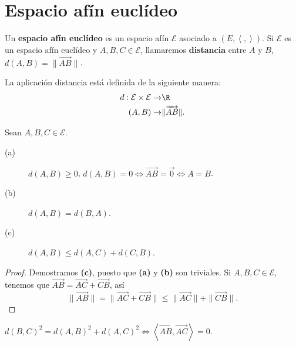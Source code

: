 \chapter{Espacio afín euclídeo}
\begin{fdefinition}
\normalfont Un \textbf{espacio afín euclídeo} es un espacio afín $\displaystyle \mathcal{E} $ asociado a $\displaystyle \left(E, \left\langle ,  \right\rangle \right) $. Si $\displaystyle \mathcal{E} $ es un espacio afín euclídeo y $\displaystyle A, B, C \in \mathcal{E} $, llamaremos \textbf{distancia} entre $\displaystyle A $ y $\displaystyle B $, $\displaystyle d\left(A,B\right) = \|\overrightarrow{AB}\| $.  
\end{fdefinition}
\begin{observation}
\normalfont La aplicación distancia está definida de la siguiente manera:
\[
\begin{split}
	d : \mathcal{E} \times \mathcal{E} \to & \R \\
	\left(A,B\right) \to & \|\overrightarrow{AB}\|.
\end{split}
\]
\end{observation}
\begin{fprop}[]
\normalfont Sean $\displaystyle A,B,C \in \mathcal{E} $. 
\begin{description}
\item[(a)] $\displaystyle d\left(A,B\right) \geq 0$, $\displaystyle d\left(A,B\right) = 0 \iff \overrightarrow{AB} = \vec{0} \iff A = B $.
\item[(b)] $\displaystyle d\left(A,B\right) = d\left(B,A\right) $. 
\item[(c)] $\displaystyle d\left(A,B\right) \leq d\left(A,C\right) + d\left(C,B\right) $.
\end{description}
\end{fprop}
\begin{proof}
Demostramos \textbf{(c)}, puesto que \textbf{(a)} y \textbf{(b)} son triviales. Si $\displaystyle A,B,C \in \mathcal{E} $, tenemos que $\displaystyle \overrightarrow{AB} = \overrightarrow{AC} + \overrightarrow{CB} $, así
\[ \|\overrightarrow{AB} \| = \|\overrightarrow{AC} + \overrightarrow{CB} \| \leq \|\overrightarrow{AC}\| + \|\overrightarrow{CB}\| .\]
\end{proof}
\begin{ftheorem}
\normalfont $\displaystyle d\left(B,C\right)^{2} = d\left(A,B\right)^{2} + d\left(A,C\right)^{2} \iff \left\langle \overrightarrow{AB}, \overrightarrow{AC} \right\rangle = 0 $.
\end{ftheorem}
